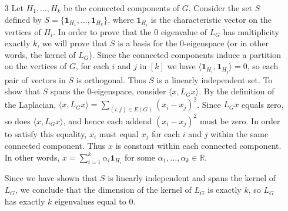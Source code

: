 \documentclass{article}
\newcommand{\R}{\mathbb{R}}
\newcommand{\1}{\mathbf{1}}
\newcommand{\0}{\mathbf{0}}
\begin{document}
\begin{enumerate}
\item[3]
  Let $H_1, \dotsc, H_k$ be the connected components of $G$.
  Consider the set $S$ defined by $S = \{\1_{H_1}, \dotsc, \1_{H_k}\}$, where $\1_{H_i}$ is the characteristic vector on the vertices of $H_i$.
  In order to prove that the $0$ eigenvalue of $L_G$ has multiplicity exactly $k$, we will prove that $S$ is a basis for the $0$-eigenspace (or in other words, the kernel of $L_G$).
  Since the connected components induce a partition on the vertices of $G$, for each $i$ and $j$ in $[k]$ we have $\langle \1_{H_i}, \1_{H_j} \rangle = 0$, so each pair of vectors in $S$ is orthogonal.
  Thus $S$ is a linearly independent set.
  To show that $S$ spans the $0$-eigenspace, consider $\langle x, L_G x \rangle$.
  By the definition of the Laplacian, $\langle x, L_G x \rangle = \sum_{(i, j) \in E(G)} (x_i - x_j)^2$.
  Since $L_G x$ equals zero, so does $\langle x, L_G x \rangle$, and hence each addend $(x_i - x_j)^2$ must be zero.
  In order to satisfy this equality, $x_i$ must equal $x_j$ for each $i$ and $j$ within the same connected component.
  Thus $x$ is constant within each connected component.
  In other words, $x = \sum_{i = 1}^k \alpha_i \1_{H_i}$ for some $\alpha_1, \dotsc, \alpha_k \in \R$.

  Since we have shown that $S$ is linearly independent and spans the kernel of $L_G$, we conclude that the dimension of the kernel of $L_G$ is exactly $k$, so $L_G$ has exactly $k$ eigenvalues equal to $0$.


\end{enumerate}
\end{document}
